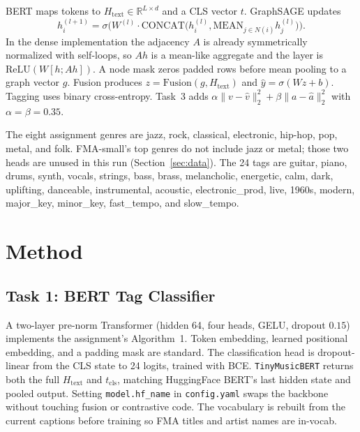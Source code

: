 \documentclass[conference]{IEEEtran}
\begin{document}
BERT maps tokens to $H_{\mathrm{text}}\in\mathbb{R}^{L\times d}$ and a CLS vector $t$. GraphSAGE updates
\begin{equation}
h_i^{(l+1)}=\sigma\Big(W^{(l)}\cdot\mathrm{CONCAT}\big(h_i^{(l)},\mathrm{MEAN}_{j\in N(i)}h_j^{(l)}\big)\Big).
\end{equation}
In the dense implementation the adjacency $A$ is already symmetrically normalized with self-loops, so $Ah$ is a mean-like aggregate and the layer is $\mathrm{ReLU}(W[h;Ah])$. A node mask zeros padded rows before mean pooling to a graph vector $g$. Fusion produces $z=\mathrm{Fusion}(g,H_{\mathrm{text}})$ and $\hat{y}=\sigma(Wz+b)$. Tagging uses binary cross-entropy. Task~3 adds $\alpha\|v-\hat{v}\|_2^2+\beta\|a-\hat{a}\|_2^2$ with $\alpha=\beta=0.35$.

The eight assignment genres are jazz, rock, classical, electronic, hip-hop, pop, metal, and folk. FMA-small's top genres do not include jazz or metal; those two heads are unused in this run (Section~\ref{sec:data}). The 24 tags are guitar, piano, drums, synth, vocals, strings, bass, brass, melancholic, energetic, calm, dark, uplifting, danceable, instrumental, acoustic, electronic\_prod, live, 1960s, modern, major\_key, minor\_key, fast\_tempo, and slow\_tempo.

\section{Method}

\subsection{Task 1: BERT Tag Classifier}
A two-layer pre-norm Transformer (hidden 64, four heads, GELU, dropout $0.15$) implements the assignment's Algorithm~1. Token embedding, learned positional embedding, and a padding mask are standard. The classification head is dropout-linear from the CLS state to 24 logits, trained with BCE. \texttt{TinyMusicBERT} returns both the full $H_{\mathrm{text}}$ and $t_{\mathrm{cls}}$, matching HuggingFace BERT's last hidden state and pooled output. Setting \texttt{model.hf\_name} in \texttt{config.yaml} swaps the backbone without touching fusion or contrastive code. The vocabulary is rebuilt from the current captions before training so FMA titles and artist names are in-vocab.
\end{document}
